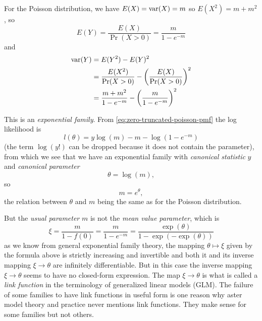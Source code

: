 For the Poisson distribution, we have $E(X) = \operatorname{var}(X) = m$
so $E(X^2) = m + m^2$, so
\begin{equation} \label{eq:mean-of-zero-truncated-Poisson}
   E(Y)
   =
   \frac{E(X)}{\Pr(X > 0)}
   =
   \frac{m}{1 - e^{- m}}
\end{equation}
and
\begin{equation} \label{eq:variance-of-zero-truncated-Poisson}
\begin{split}
   \operatorname{var}(Y)
   & =
   E(Y^2) - E(Y)^2
   \\
   & =
   \frac{E(X^2)}{\Pr(X > 0)} - \left(\frac{E(X)}{\Pr(X > 0)}\right)^2
   \\
   & =
   \frac{m + m^2}{1 - e^{- m}} - \left( \frac{m}{1 - e^{- m}} \right)^2
\end{split}
\end{equation}

This is an \emph{exponential family}.
From \eqref{eq:zero-truncated-poisson-pmf} the log likelihood is
$$
   l(\theta) = y \log(m) - m - \log(1 - e^{- m})
$$
(the term $\log(y !)$ can be dropped because it does not contain the
parameter), from which we see that we have an exponential family with
\emph{canonical statistic} $y$ and \emph{canonical parameter}
$$
   \theta = \log(m),
$$
so
$$
   m = e^{\theta},
$$
the relation between $\theta$ and $m$ being the same as for the Poisson
distribution.

But the \emph{usual parameter} $m$ is not the \emph{mean value parameter},
which is
\begin{equation} \label{eq:zero-truncated-poisson-theta-to-xi}
   \xi = \frac{m}{1 - f(0)} = \frac{m}{1 - e^{- m}}
   = \frac{\exp(\theta)}{1 - \exp(- \exp(\theta))}
\end{equation}
as we know from general exponential family theory,
the mapping $\theta \mapsto \xi$ given by the formula above is
strictly increasing and invertible and both it and its inverse mapping
$\xi \to \theta$ are infinitely differentiable.  But in this case
the inverse mapping $\xi \to \theta$ seems to have no closed-form expression.
The map $\xi \to \theta$ is what is called a \emph{link function} in the
terminology of generalized linear models (GLM).  The failure of some
families to have link functions in useful form is one reason why aster
model theory and practice never mentions link functions.  They make
sense for some families but not others.


